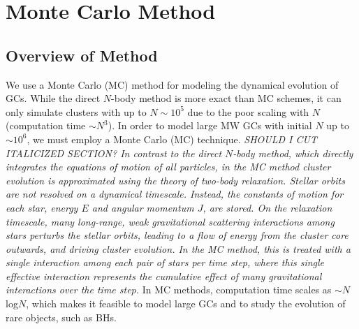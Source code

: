 \documentclass[12pt,preprint]{aastex}
\begin{document}
\section{Monte Carlo Method}

\subsection{Overview of Method}

We use a Monte Carlo (MC) method for modeling the dynamical evolution of GCs.
While the direct $N$-body method is more exact than MC schemes, 
it can only simulate clusters with up to $N \sim 10^5$ due to the
poor scaling with $N$ (computation time $\sim N^3$). In order to model large MW GCs
with initial $N$ up to $\sim 10^6$, we must employ a Monte Carlo (MC) technique. 
\emph{SHOULD I CUT ITALICIZED SECTION? In contrast to the direct $N$-body method, 
which directly integrates the equations 
of motion of all particles, in the MC method cluster evolution is approximated using the 
theory of two-body relaxation. Stellar orbits are not resolved on a dynamical
timescale. Instead, the constants of motion for each star, energy $E$ and angular 
momentum $J$, are stored. On the relaxation timescale, many long-range,
weak gravitational scattering interactions among stars perturbs the stellar orbits, 
 leading to a flow of energy from the cluster core outwards, and driving 
 cluster evolution. In the MC method, this is treated with a single interaction
  among each pair of stars per time step, where this single effective interaction 
  represents the cumulative effect of many gravitational interactions over
   the time step.} In MC methods, computation time scales as 
   $\sim N$ log$N$, which makes it feasible to model large
 GCs and to study the evolution of rare objects, such as BHs.
\end{document}
